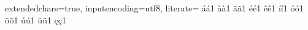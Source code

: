 {  %
  extendedchars=true,
  inputencoding=utf8,
  literate=
    {á}{{\'a}}1
    {à}{{\`a}}1
    {ã}{{\~a}}1
    {é}{{\'e}}1
    {ê}{{\^e}}1
    {í}{{\'i}}1
    {ó}{{\'o}}1
    {õ}{{\~o}}1
    {ú}{{\'u}}1
    {ü}{{\"u}}1
    {ç}{{\c{c}}}1
}

